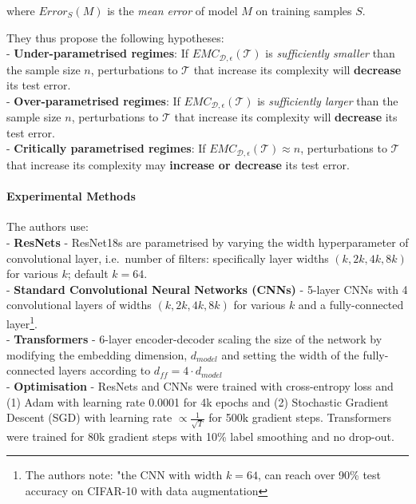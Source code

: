 \documentclass[]{article}
\let\oldparagraph\paragraph
\renewcommand{\paragraph}[1]{\oldparagraph{#1}\mbox{}}
\begin{document}
where \(Error_S(M)\) is the \emph{mean error} of model \(M\) on training
samples \(S\).

They thus propose the following hypotheses:\\
- \textbf{Under-parametrised regimes}: If
\(EMC_{\mathcal{D}, \epsilon}(\mathcal{T})\) is \emph{sufficiently
smaller} than the sample size \(n\), perturbations to \(\mathcal{T}\)
that increase its complexity will \textbf{decrease} its test error.\\
- \textbf{Over-parametrised regimes}: If
\(EMC_{\mathcal{D}, \epsilon}(\mathcal{T})\) is \emph{sufficiently
larger} than the sample size \(n\), perturbations to \(\mathcal{T}\)
that increase its complexity will \textbf{decrease} its test error.\\
- \textbf{Critically parametrised regimes}: If
\(EMC_{\mathcal{D}, \epsilon}(\mathcal{T}) \approx n\), perturbations to
\(\mathcal{T}\) that increase its complexity may \textbf{increase or
decrease} its test error.

\hypertarget{experimental-methods}{%
\paragraph{Experimental Methods}\label{experimental-methods}}

The authors use:\\
- \textbf{ResNets} - ResNet18s are parametrised by varying the width
hyperparameter of convolutional layer, i.e.~number of filters:
specifically layer widths \((k, 2k, 4k, 8k)\) for various \(k\); default
\(k=64\).\\
- \textbf{Standard Convolutional Neural Networks (CNNs)} - 5-layer CNNs
with 4 convolutional layers of widths \((k, 2k, 4k, 8k)\) for various
\(k\) and a fully-connected layer\footnote{The authors note: "the CNN
  with width \(k = 64\), can reach over 90\% test accuracy on CIFAR-10
  with data augmentation}.\\
- \textbf{Transformers} - 6-layer encoder-decoder scaling the size of
the network by modifying the embedding dimension, \(d_{model}\) and
setting the width of the fully-connected layers according to
\(d_{ff} = 4 \cdot d_{model}\)\\
- \textbf{Optimisation} - ResNets and CNNs were trained with
cross-entropy loss and (1) Adam with learning rate 0.0001 for 4k epochs
and (2) Stochastic Gradient Descent (SGD) with learning rate
\(\propto \frac{1}{\sqrt{T}}\) for 500k gradient steps. Transformers
were trained for 80k gradient steps with 10\% label smoothing and no
drop-out.
\end{document}
